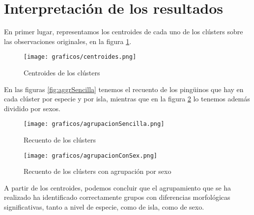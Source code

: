 \documentclass[a4paper,onecolumn]{extarticle}
\let\stdsection\section
\renewcommand\section{\newpage\stdsection}
\begin{document}
\begin{sloppypar}
\section{Interpretación de los resultados} \label{resultados}
En primer lugar, representamos los centroides de cada uno de los clústers sobre las observaciones originales, en la figura \ref{fig:centroides}.
\begin{center}
    \begin{figure}[h!]
        \centering
        \texttt{[image: graficos/centroides.png]}
        \caption{Centroides de los clústers}
        \label{fig:centroides}
    \end{figure}
\end{center}
En las figuras \ref{fig:aggrSencilla} tenemos el recuento de los pingüinos que hay en cada clúster por especie y por isla, mientras que en la figura 
\ref{fig:aggrSex} lo tenemos además dividido por sexos.
\begin{center}
    \begin{figure}[h!]
        \centering
        \begin{minipage}{0.4\textwidth}
            \centering
            \texttt{[image: graficos/agrupacionSencilla.png]}
            \caption{Recuento de los clústers}
            \label{fig:aggrSencilla}
        \end{minipage}
        \hspace{0.005\textwidth} %
        \begin{minipage}{0.4\textwidth}
            \centering
            \texttt{[image: graficos/agrupacionConSex.png]}
            \caption{Recuento de los clústers con agrupación por sexo}
            \label{fig:aggrSex}
        \end{minipage}
    \end{figure}
\end{center}

A partir de los centroides, podemos concluir que el agrupamiento que se ha realizado ha identificado correctamente grupos con diferencias morfológicas 
significativas, tanto a nivel de especie, como de isla, como de sexo.


\end{sloppypar}
\end{document}
